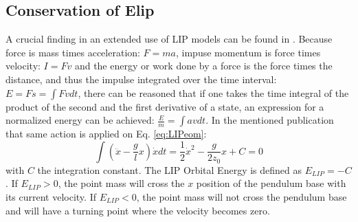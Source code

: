 \subsection{Conservation of \ac{Elip}}
A crucial finding in an extended use of \ac{LIP} models can be found in \cite{kajita1992dynamic}. Because force is mass times acceleration: $F=ma$, impuse momentum is force times velocity: $I=Fv$ and the energy or work done by a force is the force times the distance, and thus the impulse integrated over the time interval: $E = Fs = \int Fv dt$, there can be reasoned that if one takes the time integral of the product of the second and the first derivative of a state, an expression for a normalized energy can be achieved: $\frac{E}{m}=\int av dt$. In the mentioned publication that same action is applied on Eq. \eqref{eq:LIPeom}:
\begin{equation}
\int (\ddot{x}-\frac{g}{l}x)\dot{x} dt = \frac{1}{2}\dot{x}^2-\frac{g}{2z_0}x +C=0
\label{eq:Elip}
\end{equation}
with $C$ the integration constant. The \ac{LIP} Orbital Energy is defined as $E_{LIP}=-C$. If $E_{LIP}>0$, the point mass will cross the $x$ position of the pendulum base with its current velocity. If $E_{LIP}<0$, the point mass will not cross the pendulum base and will have a turning point where the velocity becomes zero.

